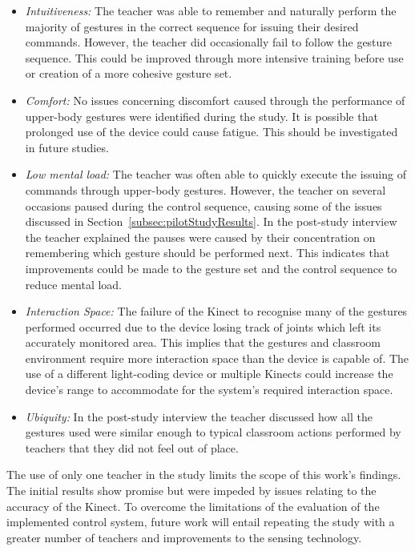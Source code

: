 \documentclass[link]{IWCOMP}
\begin{document}
\begin{itemize}
\item \textit{{Intuitiveness:}}  The teacher was able to remember and naturally perform the majority of gestures in the correct sequence for issuing their desired commands.
However, the teacher did occasionally fail to follow the gesture sequence.
This could be improved through more intensive training before use or creation of a more cohesive gesture set.
\item \textit{{Comfort:}}  No issues concerning discomfort caused through the performance of upper-body gestures were identified during the study.
It is possible that prolonged use of the device could cause fatigue.
This should be investigated in future studies.
\item \textit{{Low mental load:}}  The teacher was often able to quickly execute the issuing of commands through upper-body gestures.
However, the teacher on several occasions paused during the control sequence, causing some of the issues discussed in Section~\ref{subsec:pilotStudyResults}.
In the post-study interview the teacher explained the pauses were caused by their concentration on remembering which gesture should be performed next.
This indicates that improvements could be made to the gesture set and the control sequence to reduce mental load.
\item \textit{{Interaction Space:}} The failure of the Kinect to recognise many of the gestures performed occurred due to the device losing track of joints which left its accurately monitored area.
This implies that the gestures and classroom environment require more interaction space than the device is capable of.
The use of a different light-coding device or multiple Kinects could increase the device's range to accommodate for the system's required interaction space.
\item \textit{{Ubiquity:}} In the post-study interview the teacher discussed how all the gestures used were similar enough to typical classroom actions performed by teachers that they did not feel out of place.\\ 
\end{itemize}

The use of only one teacher in the study limits the scope of this work's findings.
The initial results show promise but were impeded by issues relating to the accuracy of the Kinect.
To overcome the limitations of the evaluation of the implemented control system, future work will entail repeating the study with a greater number of teachers and improvements to the sensing technology.
\end{document}
